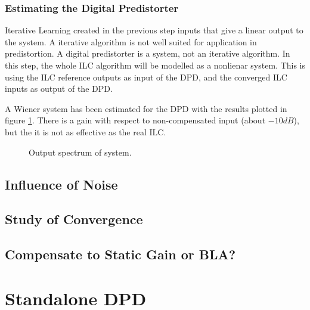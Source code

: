 	\subsubsection{Estimating the Digital Predistorter}

	Iterative Learning created in the previous step inputs that give a linear output to the system. A iterative algorithm is not well suited for application in predistortion. A digital predistorter is a system, not an iterative algorithm. In this step, the whole ILC algorithm  will be modelled as a nonlienar system. This is using the ILC reference outputs as input of the DPD, and the converged ILC inputs as output of the DPD.
	
	A Wiener system has been estimated for the DPD with the results plotted in figure \ref{fig:validation}.
	There is a gain with respect to non-compensated input (about $-10dB$), but the it is not as effective as the real ILC. 
	\begin{figure}
		\centering
		\setlength\figureheight{3cm} 
		\setlength{}
		
		\caption{Output spectrum of system.}
		\label{fig:validation}
	\end{figure}


	\subsection{Influence of Noise}
	\subsection{Study of Convergence}
	\subsection{Compensate to Static Gain or BLA?}

\section{Standalone DPD}